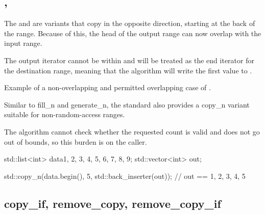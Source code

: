 \subsection{\texorpdfstring{, }{\texttt{std::copy\_backward}, \texttt{std::move\_backward}}}

The  and  are variants that copy in the opposite direction, starting at the back of the range. Because of this, the head of the output range can now overlap with the input range.



The output iterator cannot be within \cpp{(first, last]} and will be treated as the end iterator for the destination range, meaning that the algorithm will write the first value to .

\begin{box-note}
\footnotesize Example of a non-overlapping and permitted overlapping case of .
\tcblower
{}
\end{box-note}

Similar to fill\_n and generate\_n, the standard also provides a copy\_n variant suitable for non-random-access ranges.



The algorithm cannot check whether the requested count is valid and does not go out of bounds, so this burden is on the caller.

\begin{box-note}
\begin{cppcode}
std::list<int> data{1, 2, 3, 4, 5, 6, 7, 8, 9};
std::vector<int> out;

std::copy_n(data.begin(), 5, std::back_inserter(out));
// out == { 1, 2, 3, 4, 5 }
\end{cppcode}
\end{box-note}

\subsection{copy\_if, remove\_copy, remove\_copy\_if}

